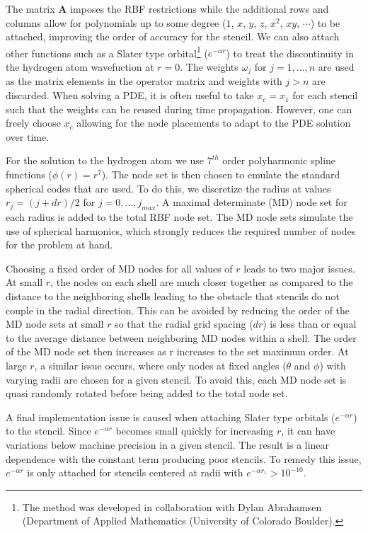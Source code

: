 The matrix $\mathbf{A}$ imposes the RBF restrictions while the additional rows and columns allow for polynomials up to some degree ($1$, $x$, $y$, $z$, $x^2$, $xy$, $\cdots$) to be attached, improving the order of accuracy for the stencil. We can also attach other functions such as a Slater type orbital\footnote{The method was developed in collaboration with Dylan Abrahamsen (Department of Applied Mathematics (University of Colorado Boulder).} ($e^{-\alpha r}$) to treat the discontinuity in the hydrogen atom wavefuction at $r=0$. The weights $\omega_j$ for $j=1, \dots, n$ are used as the matrix elements in the operator matrix and weights with $j>n$ are discarded. When solving a PDE, it is often useful to take $x_c=x_1$ for each stencil such that the weights can be reused during time propagation. However, one can freely choose $x_c$ allowing for the node placements to adapt to the PDE solution over time. 

For the solution to the hydrogen atom we use $7^{th}$ order polyharmonic spline functions ($\phi(r)=r^7$). The node set is then chosen to emulate the standard spherical codes that are used. To do this, we discretize the radius at values $r_j=(j+dr)/2$ for $j=0, \dots, j_{max}$. A maximal determinate (MD) node set \cite{WomersleyMDNodes} for each radius is added to the total RBF node set. The MD node sets simulate the use of spherical harmonics, which strongly reduces the required number of nodes for the problem at hand. 

Choosing a fixed order of MD nodes for all values of $r$ leads to two major issues. At small $r$, the nodes on each shell are much closer together as compared to the distance to the neighboring shells leading to the obstacle that stencils do not couple in the radial direction. This can be avoided by reducing the order of the MD node sets at small $r$ so that the radial grid spacing ($dr$) is less than or equal to the average distance between neighboring MD nodes within a shell. The order of the MD node set then increases as r increases to the set maximum order. At large $r$, a similar issue occurs, where only nodes at fixed angles ($\theta$ and $\phi$) with varying radii are chosen for a given stencil. To avoid this, each MD node set is quasi randomly rotated before being added to the total node set. 

A final implementation issue is caused when attaching Slater type orbitals ($e^{-\alpha r}$) to the stencil. Since $e^{-\alpha r}$ becomes small quickly for increasing $r$, it can have variations below machine precision in a given stencil. The result is a linear dependence with the constant term producing poor stencils. To remedy this issue, $e^{-\alpha r}$ is only attached for stencils centered at radii with $e^{-\alpha r_1}>10^{-10}$.

